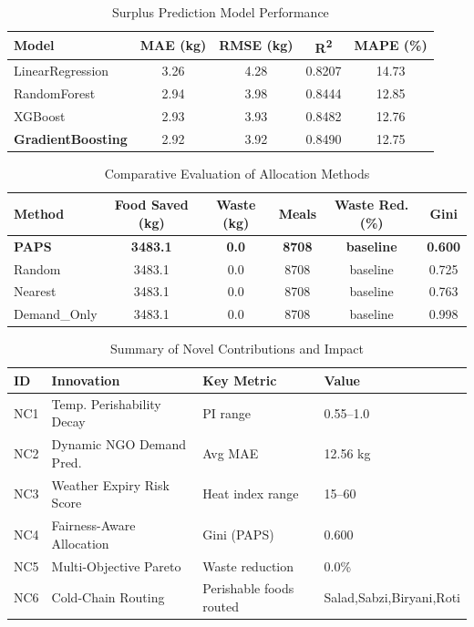 \documentclass{article}
\begin{document}
\begin{table}[h]
\centering
\caption{Surplus Prediction Model Performance}
\label{tab:model_comparison}
\begin{tabular}{lcccc}
\toprule
Model & MAE (kg) & RMSE (kg) & R\textsuperscript{2} & MAPE (\%) \\
\midrule
{LinearRegression} & 3.26 & 4.28 & 0.8207 & 14.73 \\
{RandomForest} & 2.94 & 3.98 & 0.8444 & 12.85 \\
{XGBoost} & 2.93 & 3.93 & 0.8482 & 12.76 \\
\textbf{GradientBoosting} & 2.92 & 3.92 & 0.8490 & 12.75 \\
\bottomrule
\end{tabular}
\end{table}

\begin{table}[h]
\centering
\caption{Comparative Evaluation of Allocation Methods}
\label{tab:method_comparison}
\begin{tabular}{lccccc}
\toprule
Method & Food Saved (kg) & Waste (kg) & Meals & Waste Red. (\%) & Gini \\
\midrule
\textbf{PAPS} & \textbf{3483.1} & \textbf{0.0} & \textbf{8708} & \textbf{baseline} & \textbf{0.600} \\
{Random} & {3483.1} & {0.0} & {8708} & {baseline} & {0.725} \\
{Nearest} & {3483.1} & {0.0} & {8708} & {baseline} & {0.763} \\
{Demand_Only} & {3483.1} & {0.0} & {8708} & {baseline} & {0.998} \\
\bottomrule
\end{tabular}
\end{table}

\begin{table}[h]
\centering
\caption{Summary of Novel Contributions and Impact}
\label{tab:nc_summary}
\begin{tabular}{llll}
\toprule
ID & Innovation & Key Metric & Value \\
\midrule
NC1 & Temp. Perishability Decay & PI range & 0.55--1.0 \\
NC2 & Dynamic NGO Demand Pred. & Avg MAE & 12.56 kg \\
NC3 & Weather Expiry Risk Score & Heat index range & 15--60 \\
NC4 & Fairness-Aware Allocation & Gini (PAPS) & 0.600 \\
NC5 & Multi-Objective Pareto & Waste reduction & 0.0\% \\
NC6 & Cold-Chain Routing & Perishable foods routed & Salad,Sabzi,Biryani,Roti \\
\bottomrule
\end{tabular}
\end{table}
\end{document}
